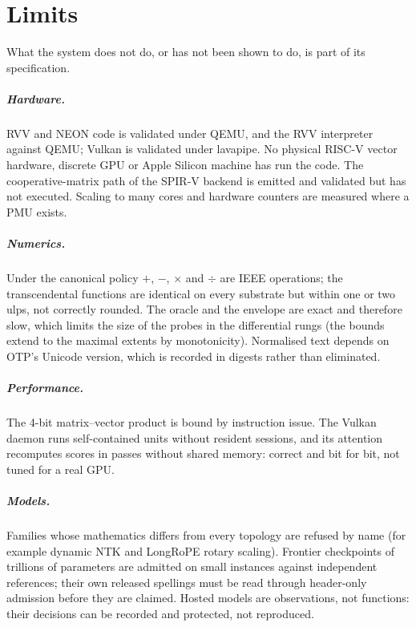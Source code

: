 \chapter{Limits}\label{ch:limits}

What the system does not do, or has not been shown to do, is part of its specification.

\paragraph{Hardware.} RVV and NEON code is validated under QEMU, and the RVV interpreter against QEMU;
Vulkan is validated under lavapipe. No physical RISC-V vector hardware, discrete GPU or Apple Silicon
machine has run the code. The cooperative-matrix path of the SPIR-V backend is emitted and validated but
has not executed. Scaling to many cores and hardware counters are measured where a PMU exists.

\paragraph{Numerics.} Under the canonical policy $+$, $-$, $\times$ and $\div$ are IEEE operations; the
transcendental functions are identical on every substrate but within one or two ulps, not correctly
rounded. The oracle and the envelope are exact and therefore slow, which limits the size of the probes in
the differential rungs (the bounds extend to the maximal extents by monotonicity). Normalised text
depends on OTP's Unicode version, which is recorded in digests rather than eliminated.

\paragraph{Performance.} The 4-bit matrix--vector product is bound by instruction issue. The Vulkan
daemon runs self-contained units without resident sessions, and its attention recomputes scores in
passes without shared memory: correct and bit for bit, not tuned for a real GPU.

\paragraph{Models.} Families whose mathematics differs from every topology are refused by name (for
example dynamic NTK and LongRoPE rotary scaling). Frontier checkpoints of trillions of parameters are
admitted on small instances against independent references; their own released spellings must be read
through header-only admission before they are claimed. Hosted models are observations, not functions:
their decisions can be recorded and protected, not reproduced.

